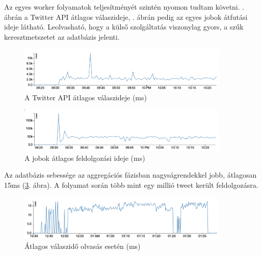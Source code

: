 Az egyes worker folyamatok teljesítményét szintén nyomon tudtam
követni.
. ábrán a Twitter API átlagos válaszideje,
. ábrán pedig az egyes jobok átfutási ideje látható.
Leolvasható, hogy a külső szolgáltatás viszonylag gyors,
a szűk keresztmetszetet az adatbázis jelenti.

\begin{figure}[h!]
  \centering
  \includegraphics[width=0.9\textwidth]{figures/mean-twitter}
  \caption{A Twitter API átlagos válaszideje (ms)}
  \label{fig:mean-twitter}
\end{figure}

\begin{figure}[h!]
  \centering
  \includegraphics[width=0.9\textwidth]{figures/mean-worker}
  \caption{A jobok átlagos feldolgozási ideje (ms)}
  \label{fig:mean-worker}
\end{figure}

Az adatbázis sebessége az aggregációs fázisban nagyságrendekkel jobb,
átlagosan 15ms (\ref{fig:mean-read}. ábra). A folyamat során több mint
egy millió tweet került feldolgozásra.

\begin{figure}[h!]
  \centering
  \includegraphics[width=0.9\textwidth]{figures/mean-read}
  \caption{Átlagos válaszidő olvasás esetén (ms)}
  \label{fig:mean-read}
\end{figure}
